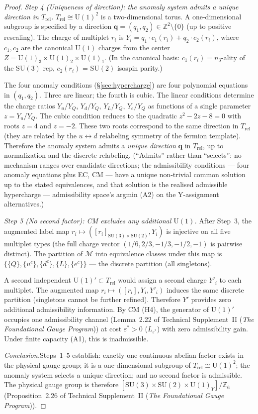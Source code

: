 \documentclass[11pt]{article}
\theoremstyle{definition}
\newcommand{\SU}{\mathrm{SU}}
\newcommand{\U}{\mathrm{U}}
\newcommand{\TSII}{Technical Supplement~II (\emph{The Foundational Gauge Program})}
\begin{document}
\begin{proof}
\textit{Step 4 (Uniqueness of direction): the anomaly system
admits a unique direction in $T_{\mathrm{rel}}$.}\quad
$T_{\mathrm{rel}} \cong \mathrm{U}(1)^2$ is a two-dimensional torus.
A one-dimensional subgroup is specified by a direction
$\mathbf{q} = (q_1, q_2) \in \mathbb{Z}^2 \setminus \{0\}$ (up to
positive rescaling).  The charge of multiplet $r_i$ is
$Y_i = q_1 \cdot c_1(r_i) + q_2 \cdot c_2(r_i)$, where
$c_1, c_2$ are the canonical $\mathrm{U}(1)$ charges from the
center $Z = \mathrm{U}(1)_3 \times \mathrm{U}(1)_2 \times
\mathrm{U}(1)_1$.  (In the canonical basis:
$c_1(r_i) = n_3$-ality of the $\SU(3)$ rep, $c_2(r_i)$ =
$\SU(2)$ isospin parity.)

The four anomaly conditions (\S\ref{sec:hypercharge}) are four
polynomial equations in $(q_1, q_2)$.  Three are linear; the
fourth is cubic.  The linear conditions determine the charge
ratios $Y_u/Y_Q$, $Y_d/Y_Q$, $Y_L/Y_Q$, $Y_e/Y_Q$
as functions of a single parameter $z = Y_u/Y_Q$.  The cubic
condition reduces to the quadratic $z^2 - 2z - 8 = 0$ with roots
$z = 4$ and $z = -2$.  These two roots correspond to the same
direction in $T_{\mathrm{rel}}$ (they are related by the
$u \leftrightarrow d$ relabeling symmetry of the fermion template).
Therefore the anomaly system admits a \emph{unique direction}
$\mathbf{q}$ in $T_{\mathrm{rel}}$, up to normalization and the
discrete relabeling.  (``Admits'' rather than ``selects'': no
mechanism ranges over candidate directions; the admissibility
conditions --- four anomaly equations plus EC, CM --- have a unique
non-trivial common solution up to the stated equivalences, and
that solution is the realised admissible hypercharge --- admissibility
space's argmin (A2) on the Y-assignment alternatives.)

\textit{Step 5 (No second factor): CM excludes any additional
$\U(1)$.}\quad
After Step~3, the augmented label map
$r_i \mapsto ([r_i]_{\SU(3) \times \SU(2)}, Y_i)$ is injective on
all five multiplet types (the full charge vector
$(1/6, 2/3, -1/3, -1/2, -1)$ is pairwise distinct).  The partition of
$\mathcal{M}$ into equivalence classes under this map is
$\{\{Q\}, \{u^c\}, \{d^c\}, \{L\}, \{e^c\}\}$ --- the discrete
partition (all singletons).

A second independent $\U(1)' \subset T_{\mathrm{rel}}$ would assign
a second charge $Y'_i$ to each multiplet.  The augmented map
$r_i \mapsto ([r_i], Y_i, Y'_i)$ induces the same discrete
partition (singletons cannot be further refined).  Therefore $Y'$
provides zero additional admissibility information.  By CM (H4), the
generator of $\U(1)'$ occupies one admissibility channel
(Lemma~2.22 of \TSII{}) at cost $\varepsilon^* > 0$
($L_{\varepsilon^*}$) with zero admissibility gain.  Under finite
capacity (A1), this is inadmissible.

\textit{Conclusion.}\quad Steps~1--5 establish: exactly one
continuous abelian factor exists in the physical gauge group; it is a
one-dimensional subgroup of $T_{\mathrm{rel}} \cong \mathrm{U}(1)^2$;
the anomaly system selects a unique direction; and no second factor is
admissible.  The physical gauge group is therefore
$[\SU(3) \times \SU(2) \times \U(1)_Y] / \mathbb{Z}_6$
(Proposition~2.26 of \TSII{}).
\end{proof}
\end{document}
